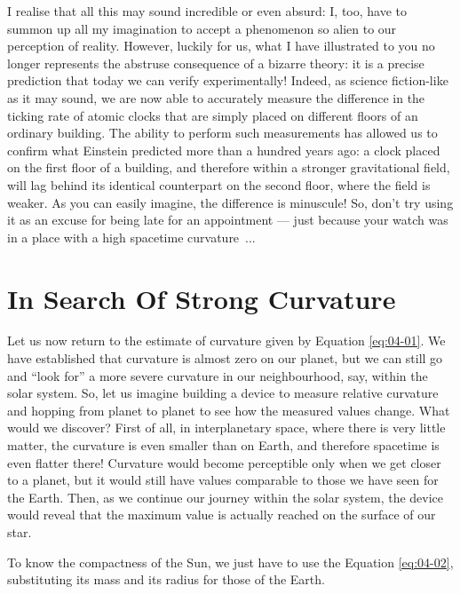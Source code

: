 I realise that all this may sound incredible or even absurd: I, too, have to summon up
all my imagination to accept a phenomenon so alien to our perception
of reality. However, luckily for us, what I have illustrated to you no longer represents
the abstruse consequence of a bizarre theory: it is a precise prediction that today we
can verify experimentally! Indeed, as science fiction-like as it may sound, we are now
able to accurately measure the difference in the ticking rate of atomic clocks that are
simply placed on different floors of an ordinary building. The ability to perform such
measurements has allowed us to confirm what Einstein predicted more than a hundred years
ago: a clock placed on the first floor of a building, and therefore within a stronger
gravitational field, will lag behind its identical counterpart on the second floor,
where the field is weaker. As you can easily imagine, the difference is minuscule! So,
don't try using it as an excuse for being late for an appointment --- just because your
watch was in a place with a high spacetime curvature~...

\section{In Search Of Strong Curvature}\label{sec:04-search}

Let us now return to the estimate of curvature given by Equation \eqref{eq:04-01}. We have
established that curvature is almost zero on our planet, but we can still go and ``look
for'' a more severe curvature in our neighbourhood, say, within the solar system. So,
let us imagine building a device to measure relative curvature and hopping from planet
to planet to see how the measured values change. What would we discover? First of all,
in interplanetary space, where there is very little matter, the curvature is even
smaller than on Earth, and therefore spacetime is even flatter there! Curvature would
become perceptible only when we get closer to a planet, but it would still have values
comparable to those we have seen for the Earth. Then, as we continue our journey within
the solar system, the device would reveal that the maximum value is actually reached on
the surface of our star.

To know the compactness of the
Sun, we just
have to use the Equation \eqref{eq:04-02}, substituting its mass and its radius for those of the
Earth.

